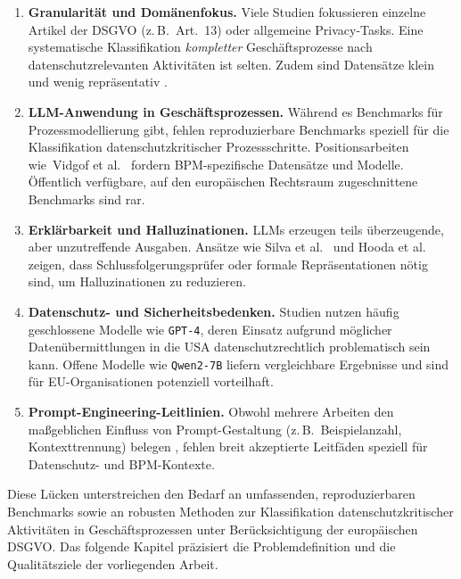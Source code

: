 \begin{enumerate}
    \item \textbf{Granularität und Domänenfokus.} Viele Studien fokussieren einzelne Artikel der \ac{DSGVO} (z.\,B.\ Art.~13) oder allgemeine Privacy-Tasks. Eine systematische Klassifikation \emph{kompletter} Geschäftsprozesse nach datenschutzrelevanten Aktivitäten ist selten. Zudem sind Datensätze klein und wenig repräsentativ \cite{nake2023towards}.
    \item \textbf{\ac{LLM}-Anwendung in Geschäftsprozessen.} Während es Benchmarks für Prozessmodellierung gibt, fehlen reproduzierbare Benchmarks speziell für die Klassifikation datenschutzkritischer Prozessschritte. Positionsarbeiten wie\linebreak~Vidgof et al.\ \cite{vidgof2023largelanguagemodelsbusiness} fordern \ac{BPM}-spezifische Datensätze und Modelle. Öffentlich verfügbare, auf den europäischen Rechtsraum zugeschnittene Benchmarks sind rar.
    \item \textbf{Erklärbarkeit und Halluzinationen.} \acp{LLM} erzeugen teils überzeugende, aber unzutreffende Ausgaben. Ansätze wie Silva et al.\ \cite{silva2024entailment} und Hooda et al.\ \cite{hooda2024policylr} zeigen, dass Schlussfolgerungsprüfer oder formale Repräsentationen nötig sind, um Halluzinationen zu reduzieren.
    \item \textbf{Datenschutz- und Sicherheitsbedenken.} Studien nutzen häufig geschlossene Modelle wie \texttt{GPT-4}, deren Einsatz aufgrund möglicher Datenübermittlungen in die USA datenschutzrechtlich problematisch sein kann. Offene Modelle wie \texttt{Qwen2-7B} liefern vergleichbare Ergebnisse \cite{schwerin2024systematic} und sind für \ac{EU}-Organisationen potenziell vorteilhaft.
    \item \textbf{Prompt-Engineering-Leitlinien.} Obwohl mehrere Arbeiten den maßgeblichen Einfluss von Prompt-Gestaltung (z.\,B.\ Beispielanzahl, Kontexttrennung) belegen \cite{liu2023prompting,pragyan2024toward}, fehlen breit akzeptierte Leitfäden speziell für Datenschutz- und \ac{BPM}-Kontexte.
\end{enumerate}

Diese Lücken unterstreichen den Bedarf an umfassenden, reproduzierbaren Benchmarks sowie an robusten Methoden zur Klassifikation datenschutzkritischer Aktivitäten in Geschäftsprozessen unter Berücksichtigung der europäischen \ac{DSGVO}. Das folgende Kapitel präzisiert die Problemdefinition und die Qualitätsziele der vorliegenden Arbeit.
